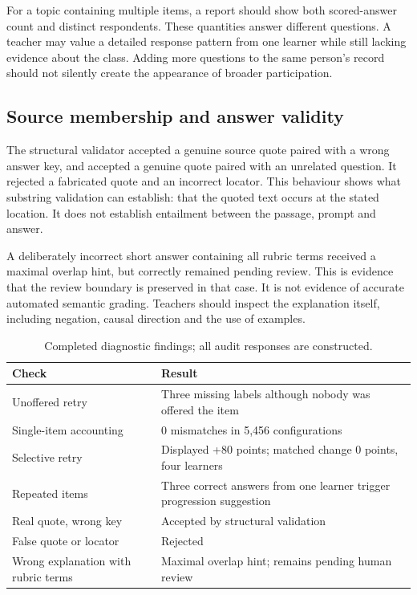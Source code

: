 For a topic containing multiple items, a report should show both scored-answer count and distinct respondents. These quantities answer different questions. A teacher may value a detailed response pattern from one learner while still lacking evidence about the class. Adding more questions to the same person's record should not silently create the appearance of broader participation.

\subsection{Source membership and answer validity}
The structural validator accepted a genuine source quote paired with a wrong answer key, and accepted a genuine quote paired with an unrelated question. It rejected a fabricated quote and an incorrect locator. This behaviour shows what substring validation can establish: that the quoted text occurs at the stated location. It does not establish entailment between the passage, prompt and answer.

A deliberately incorrect short answer containing all rubric terms received a maximal overlap hint, but correctly remained pending review. This is evidence that the review boundary is preserved in that case. It is not evidence of accurate automated semantic grading. Teachers should inspect the explanation itself, including negation, causal direction and the use of examples.

\begin{table}[ht]
\caption{Completed diagnostic findings; all audit responses are constructed.}
\begin{tabular}{@{}p{}p{}@{}}
\toprule
Check & Result\\
\midrule
Unoffered retry & Three missing labels although nobody was offered the item\\
Single-item accounting & 0 mismatches in 5,456 configurations\\
Selective retry & Displayed +80 points; matched change 0 points, four learners\\
Repeated items & Three correct answers from one learner trigger progression suggestion\\
Real quote, wrong key & Accepted by structural validation\\
False quote or locator & Rejected\\
Wrong explanation with rubric terms & Maximal overlap hint; remains pending human review\\
\bottomrule
\end{tabular}
\end{table}

